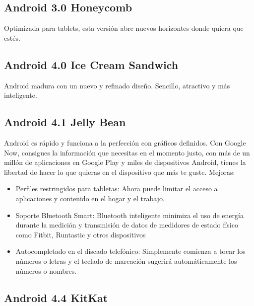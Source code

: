 \documentclass[letterpaper,12pt,openany,oneside]{book}
\begin{document}
\subsection{Android 3.0 Honeycomb}
Optimizada para tablets, esta versión abre nuevos horizontes donde quiera que estés.
\subsection{Android 4.0 Ice Cream Sandwich}
Android madura con un nuevo y refinado diseño. Sencillo, atractivo y más inteligente.
\subsection{Android 4.1 Jelly Bean}
Android es rápido y funciona a la perfección con gráficos definidos. Con Google Now, consigues la información que necesitas en el momento justo, con más de un millón de aplicaciones en Google Play y miles de dispositivos Android, tienes la libertad de hacer lo que quieras en el dispositivo que más te guste.
Mejoras:

\flushleft
\begin{itemize}
 \item Perfiles restringidos para tabletas: Ahora puede limitar el acceso a aplicaciones y contenido en el hogar y el trabajo.
 \item Soporte Bluetooth Smart: Bluetooth inteligente minimiza el uso de energía durante la medición y transmisión de datos de medidores de estado físico como Fitbit, Runtastic y otros dispositivos
 \item Autocompletado en  el discado telefónico:  Simplemente comienza a tocar los números o letras y el teclado de marcación sugerirá automáticamente los números o nombres.
\end{itemize}


\subsection{Android 4.4 KitKat}
\end{document}
